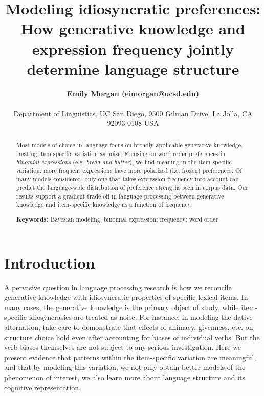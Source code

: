 \documentclass[10pt,letterpaper]{article}
\title{Modeling idiosyncratic preferences: How generative knowledge and expression frequency jointly determine language structure}
\author{{\large \bf Emily Morgan (eimorgan@ucsd.edu)} \\
  \AND {\large \bf Roger Levy (rlevy@ucsd.edu)} \\
  Department of Linguistics, UC San Diego, 9500 Gilman Drive,
  La Jolla, CA 92093-0108 USA}
\begin{document}
\maketitle


\begin{abstract}
Most models of choice in language focus on broadly applicable generative knowledge, treating item-specific variation as noise. Focusing on word order preferences in \emph{binomial expressions} (e.g. \emph{bread and butter}), we find meaning in the item-specific variation: more frequent expressions have more polarized (i.e. frozen) preferences. Of many models considered, only one that takes expression frequency into account can predict the language-wide distribution of preference strengths seen in corpus data. Our results support a gradient trade-off in language processing between generative knowledge and item-specific knowledge as a function of frequency.

\textbf{Keywords:} 
Bayesian modeling; binomial expression; frequency; word order
\end{abstract}

\section{Introduction}
A pervasive question in language processing research is how we reconcile generative knowledge with idiosyncratic properties of specific lexical items. In many cases, the generative knowledge is the primary object of study, while item-specific idiosyncrasies are treated as noise. For instance, in modeling the dative alternation, \citet{Bresnan:2007td} take care to demonstrate that effects of animacy, givenness, etc. on structure choice hold even after accounting for biases of individual verbs. But the verb biases themselves are not subject to any serious investigation. Here we present evidence that patterns within the item-specific variation are meaningful, and that by modeling this variation, we not only obtain better models of the phenomenon of interest, we also learn more about language structure and its cognitive representation.
\end{document}
